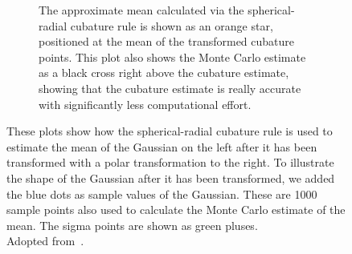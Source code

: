 \begin{figure}
\begin{subfigure}[t]{0.5\linewidth}
			\caption[Transformed in Cartesian coordinates to illustrate cubature rules]{The approximate mean calculated via the spherical-radial cubature rule is shown as an orange star, positioned at the mean of the transformed cubature points. This plot also shows the Monte Carlo estimate as a black cross right above the cubature estimate, showing that the cubature estimate is really accurate with significantly less computational effort.}
		\end{subfigure}
		\caption[Illustrative application of the spherical-radial cubature rule to the mapping from polar coordinate to Cartesian coordinates]{These plots show how the spherical-radial cubature rule is used to estimate the mean of the Gaussian on the left after it has been transformed with a polar transformation to the right. To illustrate the shape of the Gaussian after it has been transformed, we added the blue dots as sample values of the Gaussian. These are 1000 sample points also used to calculate the Monte Carlo estimate of the mean. The sigma points are shown as green pluses. \\ Adopted from~\cite{solinCubatureIntegrationMethods2010}.}
		\label{fig:cubature}
	\end{figure}

